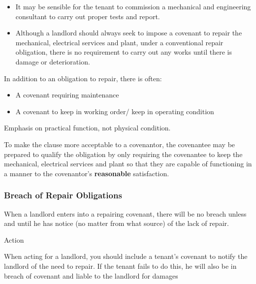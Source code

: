 \documentclass[
]{article}
\providecommand{\tightlist}{%
  \setlength{\itemsep}{0pt}\setlength{\parskip}{0pt}}
\newenvironment{env-da05fb3b-c564-4905-b729-fa3c9eadbf7c}
{
    \savenotes\tcolorbox[blanker,breakable,left=5pt,borderline west={2pt}{-4pt}{aquamarine}]
}
{
    \endtcolorbox\spewnotes
}
\begin{document}
\begin{itemize}
\tightlist
\item
  It may be sensible for the tenant to commission a mechanical and
  engineering consultant to carry out proper tests and report.
\item
  Although a landlord should always seek to impose a covenant to repair
  the mechanical, electrical services and plant, under a conventional
  repair obligation, there is no requirement to carry out any works
  until there is damage or deterioration.
\end{itemize}

In addition to an obligation to repair, there is often:

\begin{itemize}
\tightlist
\item
  A covenant requiring maintenance
\item
  A covenant to keep in working order/ keep in operating condition
\end{itemize}

Emphasis on practical function, not physical condition.

To make the clause more acceptable to a covenantor, the covenantee may
be prepared to qualify the obligation by only requiring the covenantee
to keep the mechanical, electrical services and plant so that they are
capable of functioning in a manner to the covenantor's
\textbf{reasonable} satisfaction.

\hypertarget{breach-of-repair-obligations}{%
\subsubsection{Breach of Repair
Obligations}\label{breach-of-repair-obligations}}

When a landlord enters into a repairing covenant, there will be no
breach unless and until he has notice (no matter from what source) of
the lack of repair.

\begin{env-da05fb3b-c564-4905-b729-fa3c9eadbf7c}

Action

When acting for a landlord, you should include a tenant's covenant to
notify the landlord of the need to repair. If the tenant fails to do
this, he will also be in breach of covenant and liable to the landlord
for damages

\end{env-da05fb3b-c564-4905-b729-fa3c9eadbf7c}
\end{document}
